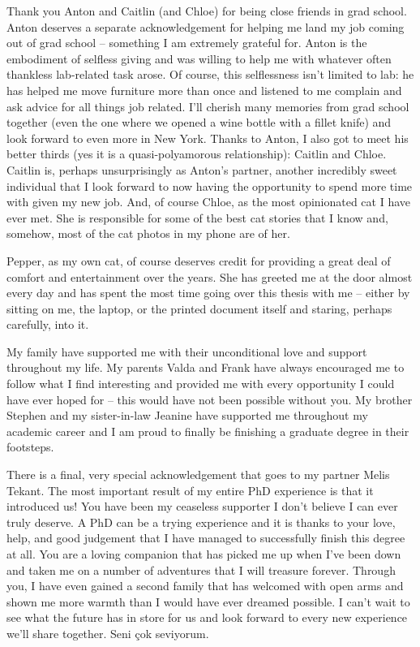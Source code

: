 Thank you Anton and Caitlin (and Chloe) for being close friends in grad school. Anton deserves a separate acknowledgement for helping me land my job coming out of grad school -- something I am extremely grateful for. Anton is the embodiment of selfless giving and was willing to help me with whatever often thankless lab-related task arose. Of course, this selflessness isn't limited to lab: he has helped me move furniture more than once and listened to me complain and ask advice for all things job related. I'll cherish many memories from grad school together (even the one where we opened a wine bottle with a fillet knife) and look forward to even more in New York. Thanks to Anton, I also got to meet his better thirds (yes it is a quasi-polyamorous relationship): Caitlin and Chloe. Caitlin is, perhaps unsurprisingly as Anton's partner,  another incredibly sweet individual that I look forward to now having the opportunity to spend more time with given my new job. And, of course Chloe, as the most opinionated cat I have ever met. She is responsible for some of the best cat stories that I know and, somehow, most of the cat photos in my phone are of her.

Pepper, as my own cat, of course deserves credit for providing a great deal of comfort and entertainment over the years. She has greeted me at the door almost every day and has spent the most time going over this thesis with me -- either by sitting on me, the laptop, or the printed document itself and staring, perhaps carefully, into it. 

My family have supported me with their unconditional love and support throughout my life. My parents Valda and Frank have always encouraged me to follow what I find interesting and provided me with every opportunity I could have ever hoped for -- this would have not been possible without you. My brother Stephen and my sister-in-law Jeanine have supported me throughout my academic career and I am proud to finally be finishing a graduate degree in their footsteps.

There is a final, very special acknowledgement that goes to my partner Melis Tekant. The most important result of my entire PhD experience is that it introduced us! You have been my ceaseless supporter I don't believe I can ever truly deserve. A PhD can be a trying experience and it is thanks to your love, help, and good judgement that I have managed to successfully finish this degree at all. You are a loving companion that has picked me up when I've been down and taken me on a number of adventures that I will treasure forever. Through you, I have even gained a second family that has welcomed with open arms and shown me more warmth than I would have ever dreamed possible. I can't wait to see what the future has in store for us and look forward to every new experience we'll share together. Seni \c{c}ok seviyorum.